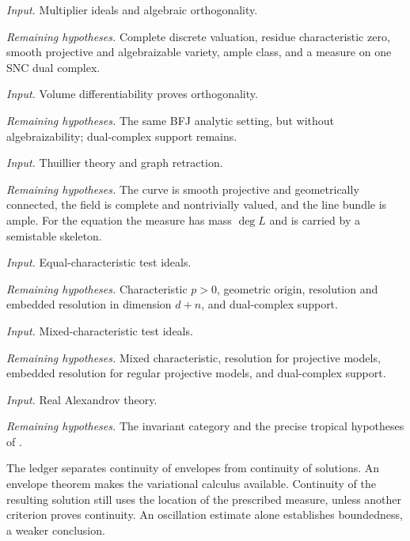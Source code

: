 \begin{description}[style=nextline,leftmargin=0pt,labelindent=0pt,
  labelsep=0pt,itemsep=.8\baselineskip,font=\normalfont\bfseries]
\item[BFJ 2015]
\emph{Input.} Multiplier ideals and algebraic orthogonality.
\par\emph{Remaining hypotheses.} Complete discrete valuation, residue
characteristic zero, smooth projective and algebraizable variety, ample
class, and a measure on one SNC dual complex.

\item[BGGJKM 2020]
\emph{Input.} Volume differentiability proves orthogonality.
\par\emph{Remaining hypotheses.} The same BFJ analytic setting, but without
algebraizability; dual-complex support remains.

\item[Curves]
\emph{Input.} Thuillier theory and graph retraction.
\par\emph{Remaining hypotheses.} The curve is smooth projective and
geometrically connected, the field is complete and nontrivially valued,
and the line bundle is ample.  For the equation the measure has mass
$\deg L$ and is carried by a semistable skeleton.

\item[GJKM 2019]
\emph{Input.} Equal-characteristic test ideals.
\par\emph{Remaining hypotheses.} Characteristic $p>0$, geometric origin,
resolution and embedded resolution in dimension $d+n$, and dual-complex
support.

\item[FGK 2025]
\emph{Input.} Mixed-characteristic test ideals.
\par\emph{Remaining hypotheses.} Mixed characteristic, resolution for
projective models, embedded resolution for regular projective models, and
dual-complex support.

\item[Toric or invariant setting]
\emph{Input.} Real Alexandrov theory.
\par\emph{Remaining hypotheses.} The invariant category and the precise
tropical hypotheses of .
\end{description}

The ledger separates continuity of envelopes from continuity of solutions.
An envelope theorem makes the variational calculus available.  Continuity of
the resulting solution still uses the location of the prescribed measure,
unless another criterion proves continuity.  An oscillation estimate
alone establishes boundedness, a weaker conclusion.

